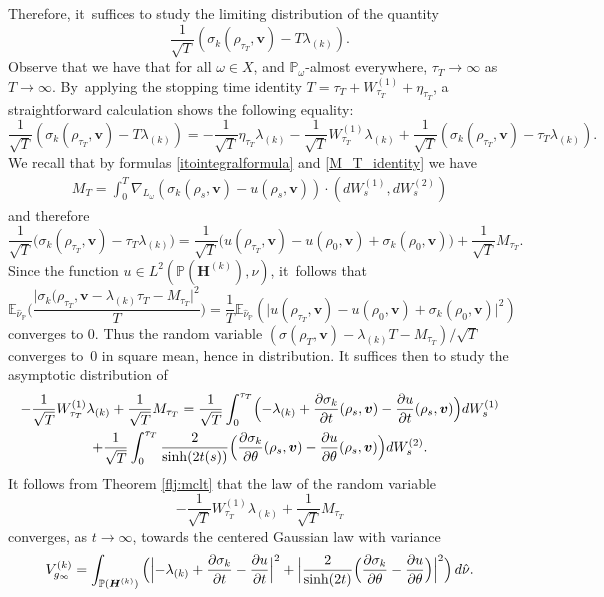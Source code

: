 \documentclass[JEP,XML,SOM,Unicode,published]{cedram}
\theoremstyle{plain}
\theoremstyle{definition}
\numberwithin{equation}{subsection}
\newcommand\bE{\mathbb{E}}
\newcommand\bP{\mathbb{P}}
\let\gradient\nabla
\newcommand{\bfH}{\boldsymbol{H}}
\newcommand{\bfv}{\boldsymbol{v}}
\begin{document}
Therefore, it~suffices to study the limiting distribution of the quantity
\[
\frac{1}{\sqrt{T}} (\sigma_k(\rho_{\tau_{T}}, \bfv)- T\lambda_{(k)}).
\] Observe that we have that for all $\omega \in X$, and $\bP_\omega$-almost everywhere, $\tau_T \to \infty$ as $T\to\infty$. By~applying the stopping time identity $T = \tau_T + W_{\tau_T}^{(1)} + \eta_{\tau_T}$, a straightforward calculation shows the following equality:
\[
\frac{1}{\sqrt{T}} (\sigma_k(\rho_{\tau_T},\bfv)- T\lambda_{(k)}) =-\frac{1}{\sqrt{T}}\eta_{\tau_T}\lambda_{(k)} \label{etas} -\frac{1}{\sqrt{T}}W_{\tau_T}^{(1)}\lambda_{(k)}+\frac{1}{\sqrt{T}}(\sigma_k(\rho_{\tau_T},\bfv) -\tau_T \lambda_{(k)}).
\]
We recall that by formulas \eqref{itointegralformula} and
\eqref{M_T_identity} we have
\begin{align*}
M_T = \int_0^T \gradient_{L_\omega} (\sigma_k(\rho_s,\bfv)-u(\rho_s,\bfv)) \cdot (dW^{(1)}_s,dW^{(2)}_s)
\end{align*}
and therefore
\[
\frac{1}{\sqrt{T}} \big(\sigma_k(\rho_{\tau_T},\bfv) - \tau_T\lambda_{(k)}\big) = \frac{1}{\sqrt{T}}\big(u(\rho_{\tau_T},\bfv)-u(\rho_0,\bfv) +\sigma_k(\rho_0,\bfv) \big) + \frac{1}{\sqrt{T}}M_{\tau_T}.
\]
Since the function $u \in L^2(\bP(\bfH^{(k)}),\nu)$, it~follows that
\[
\bE_{{\hat{\nu}_\bP}}\Big(\frac{\vert \sigma_k(\rho_{\tau_T},{\bfv} -\lambda_{(k)} \tau_T - M_{\tau_T}\vert^2}{T}\Big) = \frac{1}{T} \bE_{{\hat{\nu}_\bP}}(\vert u(\rho_{\tau_T}, \bfv)- u(\rho_0, \bfv) + \sigma_k(\rho_0, \bfv)\vert^2)
\]
converges to $0$. Thus the random variable $(\sigma(\rho_T,{\bfv}) -\lambda_{(k)} T-M_{\tau_T})/\sqrt{T}$ converges to~$0$ in square mean, hence in distribution.
It suffices then to study the asymptotic distribution of
\begin{multline*}
-\frac{1}{\sqrt{T}}W_{\tau_T}^{(1)}\lambda_{(k)}+\frac{1}{\sqrt{T}}M_{\tau_T}= \frac{1}{\sqrt{T}}\int_0^{\tau_T}\Bigl(-\lambda_{(k)}+\frac{\partial\sigma_k}{\partial t}(\rho_s, \bfv)- \frac{\partial u}{\partial t}(\rho_s,\bfv)\Bigr)dW_s^{(1)}\\
+\frac{1}{\sqrt{T}}\int_0^{\tau_T}\frac{2}{\sinh(2t(s))}\Bigl(\frac{\partial\sigma_k}{\partial \theta}(\rho_s, \bfv)- \frac{\partial u}{\partial \theta}(\rho_s,\bfv)\Bigr)dW_s^{(2)}.
\end{multline*}
It follows from Theorem \ref{flj:mclt} that the
law of the random variable
\[
-\frac{1}{\sqrt{T}}W_{\tau_T}^{(1)}\lambda_{(k)}+\frac{1}{\sqrt{T}}M_{\tau_T}
\] converges, as \(t \to \infty\), towards the centered Gaussian law with variance
\[
V^{(k)}_{g_\infty}= \int_{\bP(\bfH^{(k)})} \Big(\Bigl\vert -\lambda_{(k)}+\frac{\partial\sigma_k}{\partial t}- \frac{\partial u}{\partial t} \Bigr\vert^2 + \Bigl\vert\frac{2}{\sinh(2t)} \Bigl(\frac{\partial\sigma_k}{\partial \theta}- \frac{\partial u}{\partial \theta} \Bigr) \Bigr\vert^2 \Big)\, d\hat\nu.
\]
\end{document}
